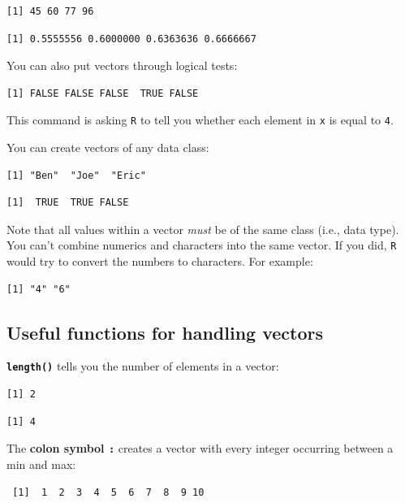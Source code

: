 \documentclass[
]{book}
\begin{document}
\begin{verbatim}
[1] 45 60 77 96
\end{verbatim}

\begin{verbatim}
[1] 0.5555556 0.6000000 0.6363636 0.6666667
\end{verbatim}

You can also put vectors through logical tests:

\begin{verbatim}
[1] FALSE FALSE FALSE  TRUE FALSE
\end{verbatim}

This command is asking \texttt{R} to tell you whether each element in \texttt{x} is equal to \texttt{4}.

You can create vectors of any data class:

\begin{verbatim}
[1] "Ben"  "Joe"  "Eric"
\end{verbatim}

\begin{verbatim}
[1]  TRUE  TRUE FALSE
\end{verbatim}

Note that all values within a vector \emph{must} be of the same class (i.e., data type). You can't combine numerics and characters into the same vector. If you did, \texttt{R} would try to convert the numbers to characters. For example:

\begin{verbatim}
[1] "4" "6"
\end{verbatim}

\hypertarget{useful-functions-for-handling-vectors}{%
\subsection{Useful functions for handling vectors}\label{useful-functions-for-handling-vectors}}

\textbf{\texttt{length()}} tells you the number of elements in a vector:

\begin{verbatim}
[1] 2
\end{verbatim}

\begin{verbatim}
[1] 4
\end{verbatim}

The \textbf{colon symbol \texttt{:}} creates a vector with every integer occurring between a min and max:

\begin{verbatim}
 [1]  1  2  3  4  5  6  7  8  9 10
\end{verbatim}
\end{document}
